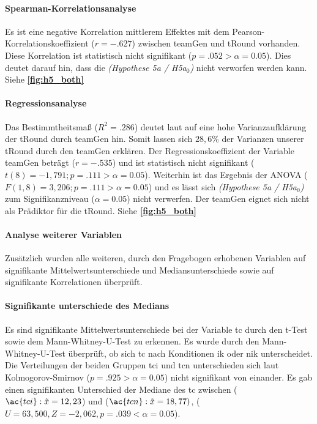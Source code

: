 \documentclass[a4paper,11pt]{article}%
\renewcommand{\\}{\vspace*{0.5\baselineskip} \newline}
\begin{document}
			\paragraph{Spearman-Korrelationsanalyse}
Es ist eine negative Korrelation mittlerem Effektes mit dem Pearson-Korrelationskoeffizient ($r = -.627$) zwischen \ac{teamGen} und \ac{tRound} vorhanden. Diese Korrelation ist statistisch nicht signifikant ($p = .052 > \alpha = 0.05$). Dies deutet darauf hin, dass die \textit{(Hypothese 5a / H5a$_{0}$)} nicht verworfen werden kann. Siehe \textbf{\autoref{fig:h5_both}}
			
			\paragraph{Regressionsanalyse}
Das Bestimmtheitsmaß ($R^{2} = .286$) deutet laut \citep{cohen2013statistical} auf eine hohe Varianzaufklärung der \ac{tRound} durch \ac{teamGen} hin. Somit lassen sich $28,6\%$ der Varianzen unserer \ac{tRound} durch den \ac{teamGen} erklären. \\
Der Regressionskoeffizient der Variable \ac{teamGen} beträgt ($r = -.535$) und ist statistisch nicht signifikant ($t(8) = -1,791; p = .111 > \alpha = 0.05$). \\
Weiterhin ist das Ergebnis der ANOVA ($F(1,8) = 3,206; p = .111 > \alpha = 0.05$) und es lässt sich \textit{(Hypothese 5a / H5a$_{0}$)} zum Signifikanzniveau ($\alpha = 0.05$) nicht verwerfen. \\
Der \ac{teamGen} eignet sich nicht als Prädiktor für die \ac{tRound}.\\
Siehe \textbf{\autoref{fig:h5_both}}

\newpage
\paragraph{Analyse weiterer Variablen}
Zusätzlich wurden alle weiteren, durch den Fragebogen erhobenen Variablen auf signifikante Mittelwertsunterschiede und Mediansunterschiede sowie auf signifikante Korrelationen überprüft.

\paragraph{Signifikante unterschiede des Medians}
Es sind signifikante Mittelwertsunterschiede bei der Variable \ac{tc} durch den t-Test sowie dem Mann-Whitney-U-Test zu erkennen.
Es wurde durch den Mann-Whitney-U-Test überprüft, ob sich \ac{tc} nach Konditionen \ac{ik} oder \ac{nik} unterscheidet. Die Verteilungen der beiden Gruppen \ac{tci} und \ac{tcn} unterschieden sich laut Kolmogorov-Smirnov ($p = .925 > \alpha = 0.05$) nicht signifikant von einander. Es gab einen signifikanten Unterschied der Mediane des \ac{tc} zwischen ($\ac{tci} : \tilde x = 12,23$) und ($\ac{tcn} : \tilde x = 18,77)$, ($U = 63,500, Z = -2,062, p = .039 < \alpha = 0.05$).
\end{document}
